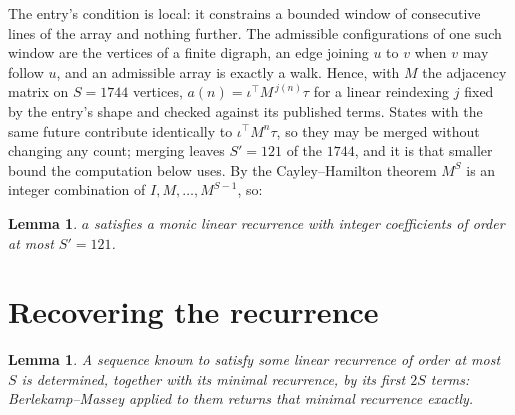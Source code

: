 \documentclass[11pt,a4paper]{article}
\theoremstyle{plain}
\newtheorem{lemma}[theorem]{Lemma}
\theoremstyle{definition}
\begin{document}
The entry's condition is local: it constrains a bounded window of consecutive lines of the
array and nothing further. The admissible configurations of one such window are the vertices
of a finite digraph, an edge joining $u$ to $v$ when $v$ may follow $u$, and an admissible
array is exactly a walk. Hence, with $M$ the adjacency matrix on $S=1744$ vertices,
$a(n)=\iota^{\!\top}M^{\,j(n)}\tau$ for a linear reindexing $j$ fixed by the entry's shape
and checked against its published terms. States with the same future contribute identically to $\iota^{\!\top}M^n\tau$, so they may be merged without changing any count; merging leaves $S'=121$ of the $1744$, and it is that smaller bound the computation below uses. By the Cayley--Hamilton theorem $M^{S}$ is an
integer combination of $I,M,\dots,M^{S-1}$, so:

\begin{lemma}\label{lem:cf}
$a$ satisfies a monic linear recurrence with integer coefficients of order at most
$S'=121$.
\end{lemma}

\section{Recovering the recurrence}

\begin{lemma}\label{lem:bm}
A sequence known to satisfy some linear recurrence of order at most $S$ is determined, together
with its minimal recurrence, by its first $2S$ terms: Berlekamp--Massey applied to them returns
that minimal recurrence exactly.
\end{lemma}
\end{document}
